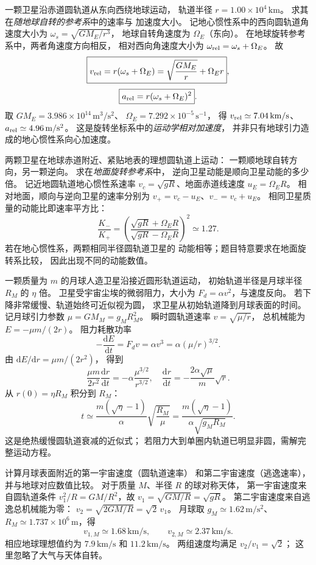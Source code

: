 一颗卫星沿赤道圆轨道从东向西绕地球运动，
轨道半径 $r=1.00\times10^4\,\mathrm{km}$。
求其在\emph{随地球自转的参考系}中的速率与
加速度大小。
\exsolution
记地心惯性系中的西向圆轨道角速度大小为
$\omega_s=\sqrt{GM_E/r^3}$，
地球自转角速度为 $\Omega_E$（东向）。
在地球旋转参考系中，两者角速度方向相反，
相对西向角速度大小为
$\omega_{\rm rel}=\omega_s+\Omega_E$。
故
\[
\boxed{v_{\rm rel}=r(\omega_s+\Omega_E)
=\sqrt{\frac{GM_E}{r}}+\Omega_Er},
\]
\[
\boxed{a_{\rm rel}=r(\omega_s+\Omega_E)^2}.
\]
取 $GM_E=3.986\times10^{14}\,\mathrm{m^3/s^2}$、
$\Omega_E=7.292\times10^{-5}\,\mathrm s^{-1}$，
得 $v_{\rm rel}\simeq7.04\,\mathrm{km/s}$、
$a_{\rm rel}\simeq4.96\,\mathrm{m/s^2}$。
\excheck 这是旋转坐标系中的\emph{运动学相对加速度}，
并非只有地球引力造成的地心惯性系向心加速度。

两颗卫星在地球赤道附近、紧贴地表的理想圆轨道上运动：
一颗顺地球自转方向，另一颗逆向。
求在\emph{地面旋转参考系}中，
逆向卫星动能是顺向卫星动能的多少倍。
\exsolution
记近地圆轨道地心惯性系速率
$v_c=\sqrt{gR}$、地面赤道线速度
$u_E=\Omega_E R$。
相对地面，顺向与逆向卫星的速率分别为
$v_+=v_c-u_E$、$v_-=v_c+u_E$。
相同卫星质量的动能比即速率平方比：
\[
\boxed{\frac{K_-}{K_+}
=\left(\frac{\sqrt{gR}+\Omega_E R}
{\sqrt{gR}-\Omega_E R}\right)^2
\simeq1.27}.
\]
\excheck 若在地心惯性系，两颗相同半径圆轨道卫星的
动能相等；题目特意要求在地面旋转系比较，
因此出现不同的动能数值。

一颗质量为 $m$ 的月球人造卫星沿接近圆形轨道运动，
初始轨道半径是月球半径 $R_M$ 的 $\eta$ 倍。
卫星受宇宙尘埃的微弱阻力，大小为
$F_d=\alpha v^2$，与速度反向。
若下降非常缓慢、轨道始终可近似视为圆，
求卫星从初始轨道降到月球表面的时间。
\exsolution
记月球引力参数 $\mu=GM_M=g_MR_M^2$。
瞬时圆轨道速率 $v=\sqrt{\mu/r}$，
总机械能为 $E=-\mu m/(2r)$。
阻力耗散功率
\[
-\frac{\mathrm dE}{\mathrm dt}
=F_dv=\alpha v^3=\alpha(\mu/r)^{3/2}.
\]
由 $\mathrm dE/\mathrm dr=\mu m/(2r^2)$，
得到
\[
\frac{\mu m}{2r^2}\frac{\mathrm dr}{\mathrm dt}
=-\alpha\frac{\mu^{3/2}}{r^{3/2}},
\quad
\frac{\mathrm dr}{\mathrm dt}
=-\frac{2\alpha\sqrt\mu}{m}\sqrt r.
\]
从 $r(0)=\eta R_M$ 积分到 $R_M$：
\[
\boxed{t\simeq
\frac{m(\sqrt\eta-1)}{\alpha}
\sqrt{\frac{R_M}{\mu}}
=\frac{m(\sqrt\eta-1)}{\alpha\sqrt{g_MR_M}}}.
\]
\excheck 这是绝热缓慢圆轨道衰减的近似式；
若阻力大到单圈内轨道已明显非圆，需解完整运动方程。

计算月球表面附近的第一宇宙速度（圆轨道速率）
和第二宇宙速度（逃逸速率），并与地球对应数值比较。
\exsolution
对于质量 $M$、半径 $R$ 的球对称天体，
第一宇宙速度来自圆轨道条件
$v_1^2/R=GM/R^2$，故
$v_1=\sqrt{GM/R}=\sqrt{gR}$。
第二宇宙速度来自逃逸总机械能为零：
$v_2=\sqrt{2GM/R}=\sqrt2\,v_1$。
月球取 $g_M\simeq1.62\,\mathrm{m/s^2}$、
$R_M\simeq1.737\times10^6\,\mathrm m$，得
\[
\boxed{v_{1,M}\simeq1.68\,\mathrm{km/s},\qquad
v_{2,M}\simeq2.37\,\mathrm{km/s}}.
\]
相应地球理想值约为
$7.9\,\mathrm{km/s}$ 和 $11.2\,\mathrm{km/s}$。
\excheck 两组速度均满足 $v_2/v_1=\sqrt2$；
这里忽略了大气与天体自转。

